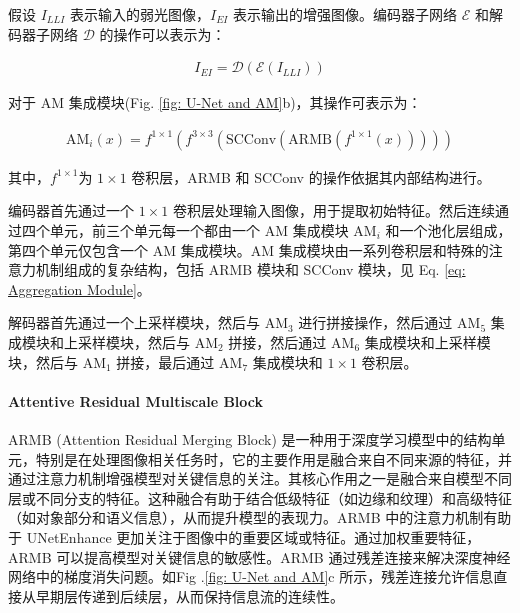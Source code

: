 \documentclass[a4paper, 10pt]{article}
\begin{document}
		假设 $I_{LLI}$ 表示输入的弱光图像，$I_{EI}$ 表示输出的增强图像。编码器子网络 $\mathcal{E}$ 和解码器子网络 $\mathcal{D}$ 的操作可以表示为：
		
		\begin{equation}
			\begin{aligned}
				I_{EI} = \mathcal{D} \left( \mathcal{E} \left( I_{LLI} \right) \right)
			\end{aligned}
			\label{eq: UNetEnhance model}
		\end{equation}
		
		对于 AM 集成模块(Fig. \ref{fig: U-Net and AM}b)，其操作可表示为：
		
		\begin{equation}
			\begin{aligned}
				\text{AM}_{i}(x) = f^{1 \times 1} \left(f^{3 \times 3} \left(\text{SCConv}\left( \text{ARMB} \left( f^{1 \times 1} (x)\right)\right)\right)\right)
			\end{aligned}
			\label{eq: Aggregation Module}
		\end{equation}
		
		其中，$f^{1\times1}$为 $1 \times 1$ 卷积层，ARMB 和 SCConv 的操作依据其内部结构进行。
		
		编码器首先通过一个 $1 \times 1$ 卷积层处理输入图像，用于提取初始特征。然后连续通过四个单元，前三个单元每一个都由一个 AM 集成模块 $\text{AM}_i$ 和一个池化层组成，第四个单元仅包含一个 AM 集成模块。AM 集成模块由一系列卷积层和特殊的注意力机制组成的复杂结构，包括 ARMB 模块和 SCConv 模块，见 Eq. \ref{eq: Aggregation Module}。
		
		解码器首先通过一个上采样模块，然后与 $\text{AM}_{3}$ 进行拼接操作，然后通过 $\text{AM}_{5}$ 集成模块和上采样模块，然后与 $\text{AM}_{2}$ 拼接，然后通过 $\text{AM}_{6}$ 集成模块和上采样模块，然后与 $\text{AM}_{1}$ 拼接，最后通过 $\text{AM}_{7}$ 集成模块和 $1 \times 1$ 卷积层。
		
		\paragraph{Attentive Residual Multiscale Block}
		
		ARMB (Attention Residual Merging Block) 是一种用于深度学习模型中的结构单元，特别是在处理图像相关任务时，它的主要作用是融合来自不同来源的特征，并通过注意力机制增强模型对关键信息的关注。其核心作用之一是融合来自模型不同层或不同分支的特征。这种融合有助于结合低级特征（如边缘和纹理）和高级特征（如对象部分和语义信息），从而提升模型的表现力。ARMB 中的注意力机制有助于 UNetEnhance 更加关注于图像中的重要区域或特征。通过加权重要特征，ARMB 可以提高模型对关键信息的敏感性。ARMB 通过残差连接来解决深度神经网络中的梯度消失问题。如Fig .\ref{fig: U-Net and AM}c 所示，残差连接允许信息直接从早期层传递到后续层，从而保持信息流的连续性。
		
\end{document}
